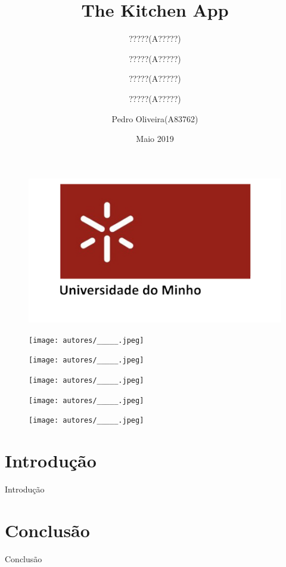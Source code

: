 \documentclass{article}
\title{The Kitchen App}
\author{?????(A?????)
\and{?????(A?????)}
\and{?????(A?????)}
\and{?????(A?????)}
\and{Pedro Oliveira(A83762)}}
\date{Maio 2019}
\begin{document}
\begin{figure}[t!]
\includegraphics[scale=0.25]{uminho.png}
\centering
\end{figure}
\maketitle
\begin{figure}[h]
  \centering
  \begin{minipage}[b]{0.3\textwidth}
    \texttt{[image: autores/\_\_\_\_\_.jpeg]}
  \end{minipage}
  \hfill
  \begin{minipage}[b]{0.3\textwidth}
    \texttt{[image: autores/\_\_\_\_\_.jpeg]}
  \end{minipage}
  \hfill
  \begin{minipage}[b]{0.3\textwidth}
    \texttt{[image: autores/\_\_\_\_\_.jpeg]}
  \end{minipage}
  \newline
  \newline
  \begin{minipage}[b]{0.3\textwidth}
    \texttt{[image: autores/\_\_\_\_\_.jpeg]}
  \end{minipage}
  \begin{minipage}[b]{0.3\textwidth}
    \texttt{[image: autores/\_\_\_\_\_.jpeg]}
  \end{minipage}
\end{figure}
\newpage
\tableofcontents
\newpage
\listoffigures
\newpage
\section{Introdução}
Introdução~~~
\newpage
\section{Conclusão}
\label{sec:conclusao}
Conclusão~~~
\end{document}
